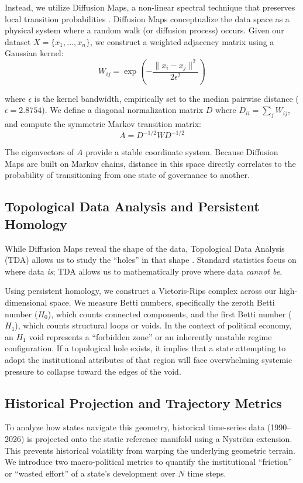 \documentclass[12pt]{article}
\begin{document}
Instead, we utilize Diffusion Maps, a non-linear spectral technique that preserves local transition probabilities \cite{coifman2006diffusion}. Diffusion Maps conceptualize the data space as a physical system where a random walk (or diffusion process) occurs. Given our dataset $X = \{x_1, ..., x_n\}$, we construct a weighted adjacency matrix using a Gaussian kernel:
$$W_{ij} = \exp\left(-\frac{\lVert x_i - x_j \rVert^2}{2\epsilon^2}\right)$$

where $\epsilon$ is the kernel bandwidth, empirically set to the median pairwise distance ($\epsilon = 2.8754$). We define a diagonal normalization matrix $D$ where $D_{ii} = \sum_j W_{ij}$, and compute the symmetric Markov transition matrix:
$$A = D^{-1/2} W D^{-1/2}$$

The eigenvectors of $A$ provide a stable coordinate system. Because Diffusion Maps are built on Markov chains, distance in this space directly correlates to the probability of transitioning from one state of governance to another.

\subsection{Topological Data Analysis and Persistent Homology}
While Diffusion Maps reveal the shape of the data, Topological Data Analysis (TDA) allows us to study the ``holes'' in that shape \cite{carlsson2009topology}. Standard statistics focus on where data \textit{is}; TDA allows us to mathematically prove where data \textit{cannot be}.

Using persistent homology, we construct a Vietoris-Rips complex across our high-\hspace{0pt}dimensional space. We measure Betti numbers, specifically the zeroth Betti number ($H_0$), which counts connected components, and the first Betti number ($H_1$), which counts structural loops or voids. In the context of political economy, an $H_1$ void represents a ``forbidden zone'' or an inherently unstable regime configuration. If a topological hole exists, it implies that a state attempting to adopt the institutional attributes of that region will face overwhelming systemic pressure to collapse toward the edges of the void.

\subsection{Historical Projection and Trajectory Metrics}
To analyze how states navigate this geometry, historical time-series data (1990--2026) is projected onto the static reference manifold using a Nyström extension. This prevents historical volatility from warping the underlying geometric terrain. We introduce two macro-po\-lit\-i\-cal metrics to quantify the institutional ``friction'' or ``wasted effort'' of a state's development over $N$ time steps.
\end{document}
